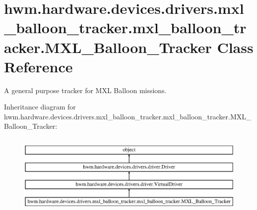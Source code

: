 \hypertarget{classhwm_1_1hardware_1_1devices_1_1drivers_1_1mxl__balloon__tracker_1_1mxl__balloon__tracker_1_1_m_x_l___balloon___tracker}{\section{hwm.\-hardware.\-devices.\-drivers.\-mxl\-\_\-balloon\-\_\-tracker.\-mxl\-\_\-balloon\-\_\-tracker.\-M\-X\-L\-\_\-\-Balloon\-\_\-\-Tracker Class Reference}
\label{classhwm_1_1hardware_1_1devices_1_1drivers_1_1mxl__balloon__tracker_1_1mxl__balloon__tracker_1_1_m_x_l___balloon___tracker}
}


A general purpose tracker for M\-X\-L Balloon missions.  


Inheritance diagram for hwm.\-hardware.\-devices.\-drivers.\-mxl\-\_\-balloon\-\_\-tracker.\-mxl\-\_\-balloon\-\_\-tracker.\-M\-X\-L\-\_\-\-Balloon\-\_\-\-Tracker\-:\begin{figure}[H]
\begin{center}
\leavevmode
\includegraphics[height=4.000000cm]{classhwm_1_1hardware_1_1devices_1_1drivers_1_1mxl__balloon__tracker_1_1mxl__balloon__tracker_1_1_m_x_l___balloon___tracker}
\end{center}
\end{figure}
